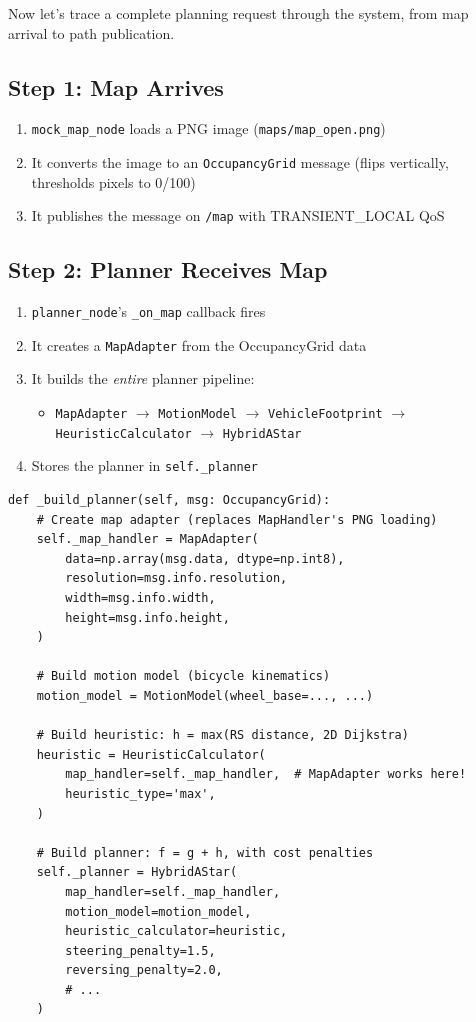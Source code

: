 \documentclass[12pt, a4paper]{article}
\begin{document}
Now let's trace a complete planning request through the system, from
map arrival to path publication.

\subsection{Step 1: Map Arrives}

\begin{enumerate}[nosep]
    \item \texttt{mock\_map\_node} loads a PNG image (\texttt{maps/map\_open.png})
    \item It converts the image to an \texttt{OccupancyGrid} message
          (flips vertically, thresholds pixels to 0/100)
    \item It publishes the message on \texttt{/map} with TRANSIENT\_LOCAL QoS
\end{enumerate}

\subsection{Step 2: Planner Receives Map}

\begin{enumerate}[nosep]
    \item \texttt{planner\_node}'s \texttt{\_on\_map} callback fires
    \item It creates a \texttt{MapAdapter} from the OccupancyGrid data
    \item It builds the \emph{entire} planner pipeline:
    \begin{itemize}[nosep]
        \item \texttt{MapAdapter} $\to$ \texttt{MotionModel} $\to$
              \texttt{VehicleFootprint} $\to$ \texttt{HeuristicCalculator}
              $\to$ \texttt{HybridAStar}
    \end{itemize}
    \item Stores the planner in \texttt{self.\_planner}
\end{enumerate}

\begin{lstlisting}[style=python, caption={Planner pipeline construction (planner\_node.py)}]
def _build_planner(self, msg: OccupancyGrid):
    # Create map adapter (replaces MapHandler's PNG loading)
    self._map_handler = MapAdapter(
        data=np.array(msg.data, dtype=np.int8),
        resolution=msg.info.resolution,
        width=msg.info.width,
        height=msg.info.height,
    )

    # Build motion model (bicycle kinematics)
    motion_model = MotionModel(wheel_base=..., ...)

    # Build heuristic: h = max(RS distance, 2D Dijkstra)
    heuristic = HeuristicCalculator(
        map_handler=self._map_handler,  # MapAdapter works here!
        heuristic_type='max',
    )

    # Build planner: f = g + h, with cost penalties
    self._planner = HybridAStar(
        map_handler=self._map_handler,
        motion_model=motion_model,
        heuristic_calculator=heuristic,
        steering_penalty=1.5,
        reversing_penalty=2.0,
        # ...
    )
\end{lstlisting}
\end{document}

